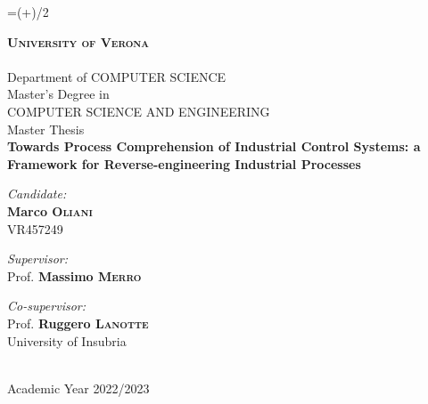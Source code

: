 
\newcommand{\thesistitle}{Towards Process Comprehension of Industrial Control Systems: a Framework for Reverse-engineering Industrial Processes}
\newcommand{\supervisor}{Prof. \textbf{Massimo \textsc{Merro}}}
\newcommand{\firstcosupervisor}{Prof. \textbf{Ruggero \textsc{Lanotte}}\\University of Insubria}
\newcommand{\secondcosupervisor}{\textbf{Marco \textsc{Lucchese}}}
\newcommand{\opponent}{Prof. \textbf{Mariano \textsc{Ceccato}}}
\newcommand{\candidate}{\textbf{Marco \textsc{Oliani}}\\VR457249}
\newcommand{\academicyear}{\normalsize Academic Year 2022/2023}

\begin{titlepage}
	\oddsidemargin=\dimexpr(\oddsidemargin+\evensidemargin)/2\relax
	\begin{center}
		\thispagestyle{empty}
		
		
		\textsc{\Large\bfseries University of Verona}\\
		\hrulefill \\[0.1cm]
		\large Department of \textsc{COMPUTER SCIENCE}\\[1.0cm]
		
		\normalsize Master's Degree in \\
		\normalsize\textsc{COMPUTER SCIENCE AND ENGINEERING}\\[1.5cm]
		
		\large Master Thesis \\[1.0cm]
		
		{ \Large\bfseries\thesistitle} \\[3.0cm]
		
		\begin{minipage}[t]{0.45\textwidth}
			\begin{flushleft} \normalsize
				\emph{Candidate:} \\
				\candidate
			\end{flushleft}
		\end{minipage}
		\begin{minipage}[t]{0.45\textwidth}\raggedleft
			\begin{flushright} \normalsize
				\emph{Supervisor:}\\
				\supervisor 
			\end{flushright}
			\begin{flushright} \normalsize
				\emph{Co-supervisor:}\\
				\firstcosupervisor \\
			\end{flushright}
		\end{minipage}
		
		\vfill
		
		\hrulefill \\[0.1cm]
		\academicyear
		
	\end{center}
\end{titlepage}

\thispagestyle{empty}